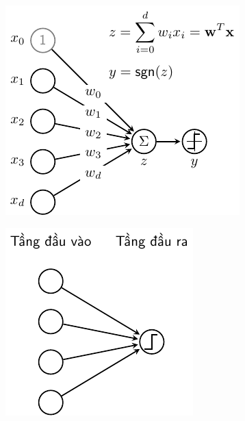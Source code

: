 \begin{figure}[h]
\begin{subfigure}{0.359\textwidth}
\includegraphics[width=1.02\linewidth]{Chapters/05_NeuralNetworks/09_perceptron/latex/pla_nn_a.pdf}
\caption{}
\label{fig:9_pla_lr_nna}
\end{subfigure}
\begin{subfigure}{0.3\textwidth}
\includegraphics[width=1.02\linewidth]{Chapters/05_NeuralNetworks/09_perceptron/latex/pla_nn_b.pdf}

\end{subfigure}
\end{figure}
